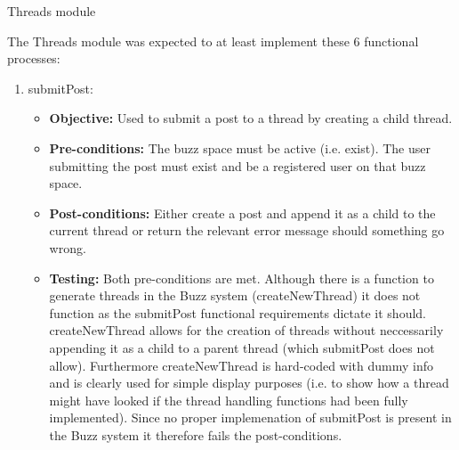 \item Threads module
	
The Threads module was expected to at least implement these 6 functional processes:
	
\begin{enumerate}
\item submitPost:
	\begin{itemize}
		\item\textbf{Objective: } Used to submit a post to a thread by creating a child thread.
		\item\textbf{Pre-conditions: } The buzz space must be active (i.e. exist). The user submitting the post must exist and be a registered user on that buzz space. 
		\item\textbf{Post-conditions: } Either create a post and append it as a child to the current thread or return the relevant error message should something go wrong.
		\item\textbf{Testing: } Both pre-conditions are met. Although there is a function to generate threads in the Buzz system (createNewThread) it does not function as the submitPost functional requirements dictate it should. createNewThread allows for the creation of threads without neccessarily appending it as a child to a parent thread (which submitPost does not allow). Furthermore createNewThread is hard-coded with dummy info and is clearly used for simple display purposes (i.e. to show how a thread might have looked if the thread handling functions had been fully implemented). Since no proper implemenation of submitPost is present in the Buzz system it therefore fails the post-conditions.


\end{itemize}
\end{enumerate}
